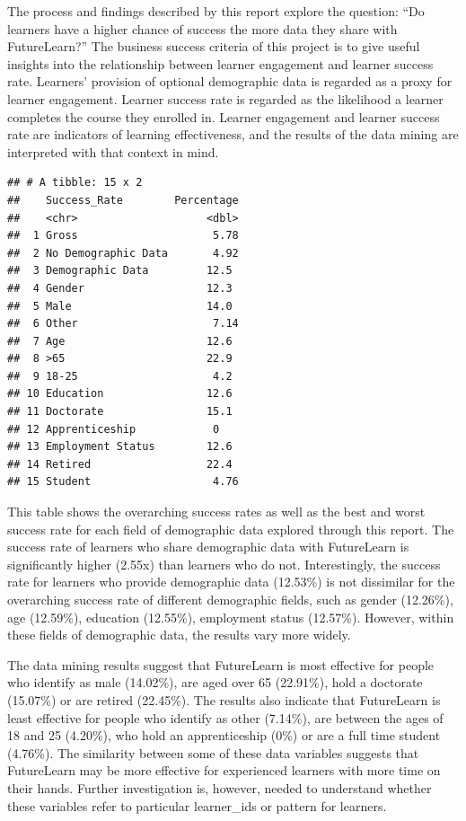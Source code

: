 \documentclass[
]{article}
\begin{document}
The process and findings described by this report explore the question:
``Do learners have a higher chance of success the more data they share
with FutureLearn?'' The business success criteria of this project is to
give useful insights into the relationship between learner engagement
and learner success rate. Learners' provision of optional demographic
data is regarded as a proxy for learner engagement. Learner success rate
is regarded as the likelihood a learner completes the course they
enrolled in. Learner engagement and learner success rate are indicators
of learning effectiveness, and the results of the data mining are
interpreted with that context in mind.

\begin{verbatim}
## # A tibble: 15 x 2
##    Success_Rate        Percentage
##    <chr>                    <dbl>
##  1 Gross                     5.78
##  2 No Demographic Data       4.92
##  3 Demographic Data         12.5 
##  4 Gender                   12.3 
##  5 Male                     14.0 
##  6 Other                     7.14
##  7 Age                      12.6 
##  8 >65                      22.9 
##  9 18-25                     4.2 
## 10 Education                12.6 
## 11 Doctorate                15.1 
## 12 Apprenticeship            0   
## 13 Employment Status        12.6 
## 14 Retired                  22.4 
## 15 Student                   4.76
\end{verbatim}

This table shows the overarching success rates as well as the best and
worst success rate for each field of demographic data explored through
this report. The success rate of learners who share demographic data
with FutureLearn is significantly higher (2.55x) than learners who do
not. Interestingly, the success rate for learners who provide
demographic data (12.53\%) is not dissimilar for the overarching success
rate of different demographic fields, such as gender (12.26\%), age
(12.59\%), education (12.55\%), employment status (12.57\%). However,
within these fields of demographic data, the results vary more widely.

The data mining results suggest that FutureLearn is most effective for
people who identify as male (14.02\%), are aged over 65 (22.91\%), hold
a doctorate (15.07\%) or are retired (22.45\%). The results also
indicate that FutureLearn is least effective for people who identify as
other (7.14\%), are between the ages of 18 and 25 (4.20\%), who hold an
apprenticeship (0\%) or are a full time student (4.76\%). The similarity
between some of these data variables suggests that FutureLearn may be
more effective for experienced learners with more time on their hands.
Further investigation is, however, needed to understand whether these
variables refer to particular learner\_ids or pattern for learners.
\end{document}
